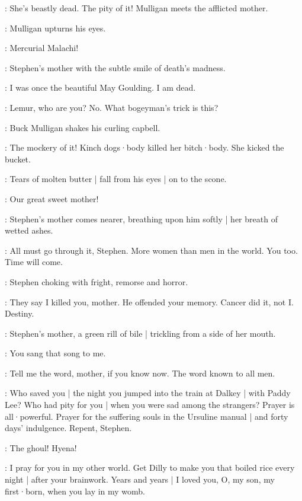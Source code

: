 \BuckMulligan:
She's beastly dead.
The pity of it!
%
Mulligan meets the afflicted mother.

:
Mulligan upturns his eyes.

\BuckMulligan:
Mercurial Malachi!

:
Stephen's mother with the subtle smile of death's madness.

\Mother:
I was once the beautiful May Goulding.
I am dead.

\Stephen:
Lemur,
who are you?
No.
What bogeyman's trick is this?

:
Buck Mulligan shakes his curling capbell.

\BuckMulligan:
The mockery of it!
Kinch dogs·body killed her bitch·body.
She kicked the bucket.

:
Tears of molten butter |
fall from his eyes |
on to the scone.

\BuckMulligan:
Our great sweet mother!
%

:
Stephen's mother comes nearer,
breathing upon him softly |
her breath of wetted ashes.

\Mother:
All must go through it,
Stephen.
More women than men in the world.
You too.
Time will come.

:
Stephen choking with fright,
remorse and horror.

\Stephen:
They say I killed you,
mother.
He offended your memory.
Cancer did it,
not I.
Destiny.

:
Stephen's mother,
a green rill of bile |
trickling from a side of her mouth.

\Mother:
You sang that song to me.
%

\Stephen:
Tell me the word,
mother,
if you know now.
The word known to all men.

\Mother:
Who saved you |
the night you jumped into the train at Dalkey |
with Paddy Lee?
Who had pity for you |
when you were sad among the strangers?
Prayer is all·powerful.
Prayer for the suffering souls in the Ursuline manual |
and forty days' indulgence.
Repent,
Stephen.

\Stephen:
The ghoul!
%
Hyena!

\Mother:
I pray for you in my other world.
Get Dilly to make you that boiled rice every night |
after your brainwork.
Years and years |
I loved you,
O,
my son,
my first·born,
when you lay in my womb.

